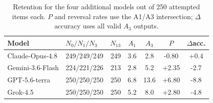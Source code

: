 \begin{table}[htbp]
\caption{Retention for the four additional models out of 250 attempted items each. $P$ and reversal rates use the A1/A3 intersection; $\Delta$accuracy uses all valid $A_3$ outputs.}
\label{tab:current_counts}
\centering
\small
\setlength{\tabcolsep}{3.5pt}
\begin{tabular}{llrcccc}
\toprule
Model & $N_0/N_1/N_3$ & $N_{13}$ & $A_1$ & $A_3$ & $P$ & $\Delta$acc. \\
\midrule
Claude-Opus-4.8 & 249/249/249 & 249 & 3.6 & 2.8 & -0.80 & +0.4 \\
Gemini-3.6-Flash & 224/221/226 & 213 & 2.8 & 5.2 & +2.35 & -2.7 \\
GPT-5.6-terra & 250/250/250 & 250 & 6.8 & 13.6 & +6.80 & -8.8 \\
Grok-4.5 & 250/250/250 & 250 & 5.2 & 8.0 & +2.80 & -4.8 \\
\bottomrule
\end{tabular}
\end{table}
